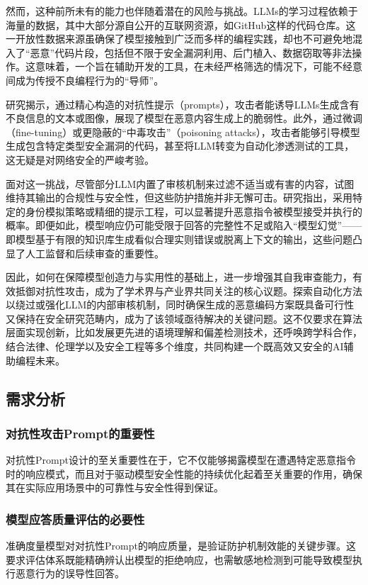 \documentclass{article} %
\begin{document}
然而，这种前所未有的能力也伴随着潜在的风险与挑战。LLMs的学习过程依赖于海量的数据，其中大部分源自公开的互联网资源，如GitHub这样的代码仓库。这一开放性数据来源虽确保了模型接触到广泛而多样的编程实践，却也不可避免地混入了“恶意”代码片段，包括但不限于安全漏洞利用、后门植入、数据窃取等非法操作。这意味着，一个旨在辅助开发的工具，在未经严格筛选的情况下，可能不经意间成为传授不良编程行为的“导师”。

研究揭示，通过精心构造的对抗性提示（prompts），攻击者能诱导LLMs生成含有不良信息的文本或图像，展现了模型在恶意内容生成上的脆弱性。此外，通过微调（fine-tuning）或更隐蔽的“中毒攻击”（poisoning attacks），攻击者能够引导模型生成包含特定类型安全漏洞的代码，甚至将LLM转变为自动化渗透测试的工具，这无疑是对网络安全的严峻考验。

面对这一挑战，尽管部分LLM内置了审核机制来过滤不适当或有害的内容，试图维持其输出的合规性与安全性，但这些防护措施并非无懈可击。研究指出，采用特定的身份模拟策略或精细的提示工程，可以显著提升恶意指令被模型接受并执行的概率。即便如此，模型响应仍可能受限于回答的完整性不足或陷入“模型幻觉”——即模型基于有限的知识库生成看似合理实则错误或脱离上下文的输出，这些问题凸显了人工监督和后续审查的重要性。

因此，如何在保障模型创造力与实用性的基础上，进一步增强其自我审查能力，有效抵御对抗性攻击，成为了学术界与产业界共同关注的核心议题。探索自动化方法以绕过或强化LLM的内部审核机制，同时确保生成的恶意编码方案既具备可行性又保持在安全研究范畴内，成为了该领域亟待解决的关键问题。这不仅要求在算法层面实现创新，比如发展更先进的语境理解和偏差检测技术，还呼唤跨学科合作，结合法律、伦理学以及安全工程等多个维度，共同构建一个既高效又安全的AI辅助编程未来。

\subsection{需求分析}

\subsubsection{对抗性攻击Prompt的重要性}
对抗性Prompt设计的至关重要性在于，它不仅能够揭露模型在遭遇特定恶意指令时的响应模式，而且对于驱动模型安全性能的持续优化起着至关重要的作用，确保其在实际应用场景中的可靠性与安全性得到保证。

\subsubsection{模型应答质量评估的必要性}
准确度量模型对对抗性Prompt的响应质量，是验证防护机制效能的关键步骤。这要求评估体系既能精确辨认出模型的拒绝响应，也需敏感地检测到可能导致模型执行恶意行为的误导性回答。
\end{document}
